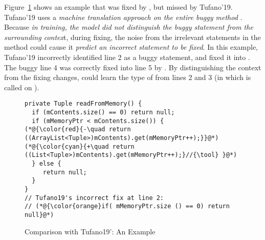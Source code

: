 
Figure~\ref{example_tufano19} shows an example that was fixed by
{\tool}, but missed by Tufano'19. Tufano'19 uses a {\em
  machine translation approach on the entire buggy method}
.  Because {\em in training, the model did not
  distinguish the buggy statement from the surrounding contex}t,
during fixing, the noise from the irrelevant statements in the method
could cause it {\em predict an incorrect statement to be fixed}. In
this example, Tufano'19 incorrectly identified line 2 as a buggy
statement, and fixed it into  
\code{()} \code{==}   . The buggy
line 4 was correctly fixed into line 5 by {\tool}. By distinguishing
the context from the fixing changes, {\tool} could learn the type
 of  from lines 2 and 3 (in which  is called on ).


\begin{figure}[t]
	\centering
	\begin{lstlisting}[]
private Tuple readFromMemory() {
  if (mContents.size() == 0) return null;
  if (mMemoryPtr < mContents.size()) {
(*@{\color{red}{-\quad return ((ArrayList<Tuple>)mContents).get(mMemoryPtr++);}}@*)
(*@{\color{cyan}{+\quad return ((List<Tuple>)mContents).get(mMemoryPtr++);}//{\tool} }@*)
  } else {
     return null;
  }
}
// Tufano19's incorrect fix at line 2:
// (*@{\color{orange}if( mMemoryPtr.size () == 0) return null}@*) 
	\end{lstlisting}
        \vspace{-15pt}
	\caption{Comparison with Tufano19': An Example}
	\label{example_tufano19}
\end{figure}

